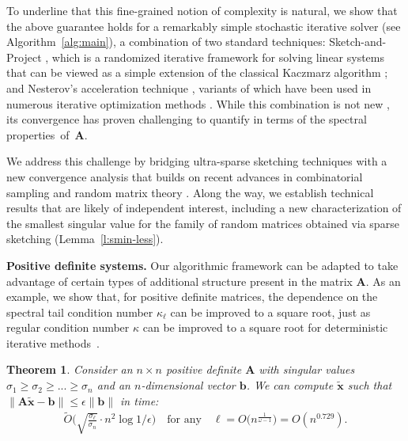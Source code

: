 \documentclass[11pt]{article}
\def\x{{\mathbf x}}
\def\b{{\mathbf b}}
\def\A{{\mathbf A}}
\newtheorem{thm}{Theorem}
\begin{document}
To underline that this fine-grained notion of complexity is natural, we show that the above guarantee holds for a remarkably simple stochastic iterative solver (see Algorithm~\ref{alg:main}), a combination of two standard techniques: Sketch-and-Project \cite{gower2015randomized}, which is a randomized iterative framework for solving linear systems that can be viewed as a simple extension of the classical Kaczmarz algorithm \cite{Kac37:Angenaeherte-Aufloesung,SV09:Randomized-Kaczmarz}; and Nesterov's acceleration technique \cite{nesterov1983method}, variants of which have been used in numerous iterative optimization methods \cite{liu2016accelerated,ye2020nesterov,even2021continuized}. While this combination is not new \cite{gower2018accelerated}, its convergence has proven challenging to quantify in terms of the spectral properties~of~$\A$. 

We address this challenge by bridging ultra-sparse sketching techniques \cite{chenakkod2023optimal} with a new convergence analysis that builds on recent advances in combinatorial sampling \cite{derezinski2020improved} and random matrix theory \cite{brailovskaya2024universality}. Along the way, we establish technical results that are likely of independent interest, including a new characterization of the smallest singular value for the family of random matrices obtained via sparse sketching (Lemma~\ref{l:smin-less}).

\smallskip

\noindent
\textbf{Positive definite systems.}
Our algorithmic framework can be adapted to take advantage of certain types of additional structure present in the matrix $\A$. As an example, we show that, for positive definite matrices, the dependence on the spectral tail condition number $\kappa_\ell$ can be improved to a square root, just as regular condition number $\kappa$ can be improved to a square root for deterministic iterative methods~\cite{axelsson1986rate}.
\begin{thm}\label{t:informal-psd}
    Consider an $n\times n$ positive definite $\A$ with singular values $\sigma_1\geq \sigma_2\geq ...\geq\sigma_{n}$ and an $n$-dimensional vector $\b$. We can compute $\tilde\x$ such that $\|\A \tilde\x-\b\|\leq \epsilon\|\b\|$ in time:
    \begin{align*}
        \tilde O\bigg(\sqrt{\frac{\sigma_{\ell}}{\sigma_n}}\cdot n^2\log1/\epsilon\bigg)\quad\text{for any}\quad \ell=O\big(n^{\frac1{\omega-1}}\big)=O(n^{0.729}).
    \end{align*}
\end{thm}
\smallskip
\end{document}

